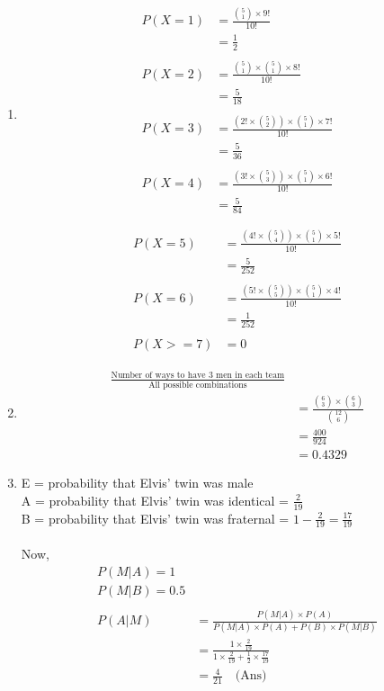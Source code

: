 \documentclass[a4paper, 12pt]{article}
\begin{document}
\begin{enumerate}
	\item 
	\begin{align*}
		P(X=1) &= \frac{\binom{5}{1}\times9!}{10!}\\
		&= \frac{1}{2}\\ \\
		P(X=2) &= \frac{\binom{5}{1}\times\binom{5}{1}\times8!}{10!}\\
		&= \frac{5}{18}\\ \\
		P(X=3) &= \frac{(2!\times\binom{5}{2})\times\binom{5}{1}\times7!}{10!}\\
		&= \frac{5}{36}\\ \\
		P(X=4) &= \frac{(3!\times\binom{5}{3})\times\binom{5}{1}\times6!}{10!}\\
		&= \frac{5}{84}\\ \\
	\end{align*}
	\begin{align*}
		P(X=5) &= \frac{(4!\times\binom{5}{4})\times\binom{5}{1}\times5!}{10!}\\
		&= \frac{5}{252}\\ \\
		P(X=6) &= \frac{(5!\times\binom{5}{5})\times\binom{5}{1}\times4!}{10!}\\
		&= \frac{1}{252}\\ \\
		P(X >= 7) &= 0
	\end{align*}
	
	\item 
	\begin{align*}
		\frac{\textrm{Number of ways to have 3 men in each team}}
		{\textrm{All possible combinations}}\\
		&= \frac{\binom{6}{3}\times\binom{6}{3}}
		{\binom{12}{6}}\\
		&= \frac{400}{924}\\
		&= 0.4329
	\end{align*}
	
	\item 
	E = probability that Elvis' twin was male\\
	A = probability that Elvis' twin was identical
	 = $\frac{2}{19}$\\
	B = probability that Elvis' twin was fraternal
	= $1-\frac{2}{19} = \frac{17}{19}$\\
	\\
	Now,
	\begin{align*}
		P(M|A) = 1\\
		P(M|B) = 0.5\\
		\\
		P(A|M) &= \frac{P(M|A)\times P(A)}
		{P(M|A)\times P(A) + P(B) \times P(M|B)}\\
		&= \frac{1 \times \frac{2}{19}}
		{1\times \frac{2}{19} + \frac{1}{2} \times
		\frac{17}{19}}\\
		&= \frac{4}{21}\quad\textrm{(Ans)}
	\end{align*}
	

\end{enumerate}
\end{document}
